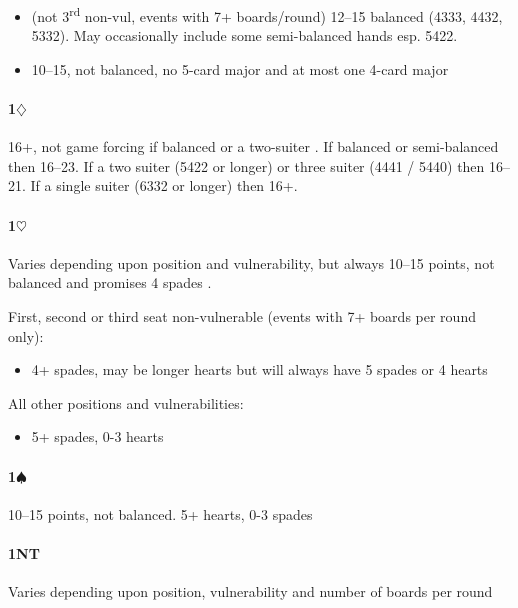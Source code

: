 \documentclass[a4paper,14pt]{extarticle}
\begin{document}
\begin{itemize}
\item (not 3\textsuperscript{rd} non-vul, events with 7+ boards/round) 12--15 balanced (4333, 4432, 5332). May occasionally include some semi-balanced hands esp. 5422.
\item 10--15, not balanced, no 5-card major and at most one 4-card major
\end{itemize}

\paragraph{1$\diamondsuit$}

16+, not game forcing if balanced or a two-suiter . If balanced or semi-balanced then 16--23. If a two suiter (5422 or longer) or three suiter (4441 / 5440) then 16--21. If a single suiter (6332 or longer) then 16+.

\paragraph{1$\heartsuit$}

Varies depending upon position and vulnerability, but always 10--15 points, not
balanced and promises 4 spades .

First, second or third seat non-vulnerable (events with 7+ boards per round only):
\begin{itemize}
\item 4+ spades, may be longer hearts but will always have 5 spades or 4 hearts
\end{itemize}

All other positions and vulnerabilities:
\begin{itemize}
\item 5+ spades, 0-3 hearts
\end{itemize}

\newpage

\paragraph{1$\spadesuit$}

10--15 points, not balanced. 5+ hearts, 0-3 spades 

\paragraph{1NT}

Varies depending upon position, vulnerability and number of boards per round
\end{document}
